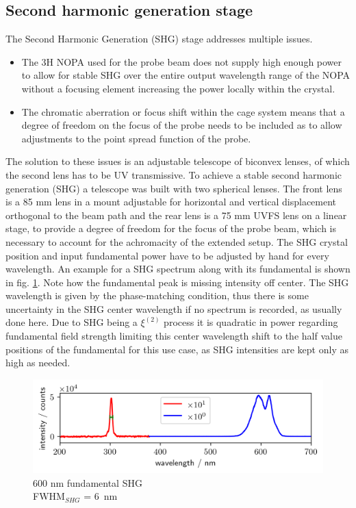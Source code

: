 \documentclass[twoside,openright]{scrreprt}
\begin{document}
\subsection{Second harmonic generation stage}\label{SHG-Stage-desc}
The Second Harmonic Generation (SHG) stage addresses multiple issues. 
\begin{itemize}
\item The 3H NOPA used for the probe beam does not supply high enough power to allow for stable SHG over the entire output wavelength range of the NOPA without a focusing element increasing the power locally within the crystal. 
\item The chromatic aberration or focus shift within the cage system means that a degree of freedom on the focus of the probe needs to be included as to allow adjustments to the point spread function of the probe.
\end{itemize}


The solution to these issues is an adjustable telescope of biconvex lenses, of which the second lens has to be UV transmissive. To achieve a stable second harmonic generation (SHG) a telescope was built with two spherical lenses. The front lens is a 85 mm lens in a mount adjustable for horizontal and vertical displacement orthogonal to the beam path and the rear lens is a 75 mm UVFS lens on a linear stage, to provide a degree of freedom for the focus of the probe beam, which is necessary to account for the achromacity of the extended setup. The SHG crystal position and input fundamental power have to be adjusted by hand for every wavelength. An example for a SHG spectrum along with its fundamental is shown in fig. \ref{fig:specSHG300nm}. Note how the fundamental peak is missing intensity off center. The SHG wavelength is given by the phase-matching condition, thus there is some uncertainty in the SHG center wavelength if no spectrum is recorded, as usually done here. Due to SHG being a $\xi^{\left(2\right)}$ process it is quadratic in power regarding fundamental field strength limiting this center wavelength shift to the half value positions of the fundamental for this use case, as SHG intensities are kept only as high as needed.
\begin{figure}[hbtp]
\centering
\includegraphics[scale=1]{images/spectra/SpectrumExampleNoFilter_300nm.png}
\caption{600 nm fundamental SHG\label{fig:specSHG300nm}\\ FWHM$_{SHG}$ = \SI{6}{\nano\meter}}
\end{figure}
\end{document}
